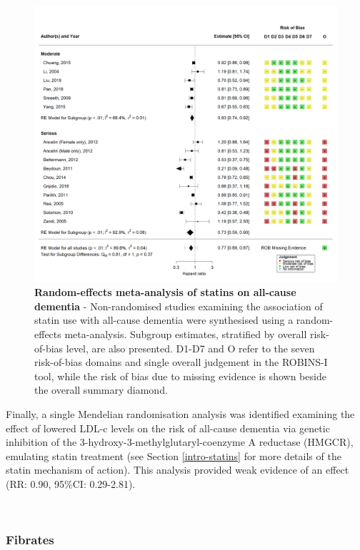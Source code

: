 \documentclass[a4paper, twoside]{templates/ociamthesis}
\begin{document}
\begin{figure}[H]
\includegraphics[width=1\linewidth]{figures/sys-rev/fp_obs_Statin-Ever_Dementia} \caption[Random-effects meta-analysis of statins on all-cause dementia]{\textbf{Random-effects meta-analysis of statins on all-cause dementia} - Non-randomised studies examining the association of statin use with all-cause dementia were synthesised using a random-effects meta-analysis. Subgroup estimates, stratified by overall risk-of-bias level, are also presented. D1-D7 and O refer to the seven risk-of-bias domains and single overall judgement in the ROBINS-I tool, while the risk of bias due to missing evidence is shown beside the overall summary diamond.}\label{fig:obsStatinDementiaFig}
\end{figure}

Finally, a single Mendelian randomisation analysis was identified examining the effect of lowered LDL-c levels on the risk of all-cause dementia via genetic inhibition of the 3-hydroxy-3-methylglutaryl-coenzyme A reductase (HMGCR), emulating statin treatment (see Section \ref{intro-statins} for more details of the statin mechanism of action). This analysis provided weak evidence of an effect (RR: 0.90, 95\%CI: 0.29-2.81).

~

\hypertarget{fibrates}{%
\subsubsection{Fibrates}\label{fibrates}}
\end{document}
